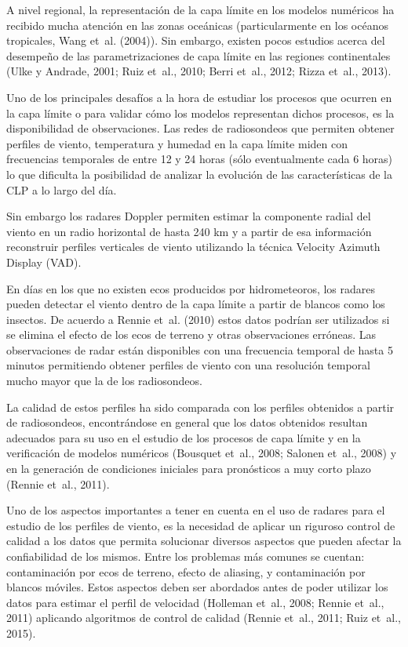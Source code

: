 \documentclass[12pt,spanish,oneside]{book}
\begin{document}
A nivel regional, la representación de la capa límite en los modelos
numéricos ha recibido mucha atención en las zonas oceánicas
(particularmente en los océanos tropicales, Wang et~al. (2004)). Sin
embargo, existen pocos estudios acerca del desempeño de las
parametrizaciones de capa límite en las regiones continentales (Ulke y
Andrade, 2001; Ruiz et~al., 2010; Berri et~al., 2012; Rizza et~al.,
2013).

Uno de los principales desafíos a la hora de estudiar los procesos que
ocurren en la capa límite o para validar cómo los modelos representan
dichos procesos, es la disponibilidad de observaciones. Las redes de
radiosondeos que permiten obtener perfiles de viento, temperatura y
humedad en la capa límite miden con frecuencias temporales de entre 12 y
24 horas (sólo eventualmente cada 6 horas) lo que dificulta la
posibilidad de analizar la evolución de las características de la CLP a
lo largo del día.

Sin embargo los radares Doppler permiten estimar la componente radial
del viento en un radio horizontal de hasta 240 km y a partir de esa
información reconstruir perfiles verticales de viento utilizando la
técnica Velocity Azimuth Display (VAD).

En días en los que no existen ecos producidos por hidrometeoros, los
radares pueden detectar el viento dentro de la capa límite a partir de
blancos como los insectos. De acuerdo a Rennie et~al. (2010) estos datos
podrían ser utilizados si se elimina el efecto de los ecos de terreno y
otras observaciones erróneas. Las observaciones de radar están
disponibles con una frecuencia temporal de hasta 5 minutos permitiendo
obtener perfiles de viento con una resolución temporal mucho mayor que
la de los radiosondeos.

La calidad de estos perfiles ha sido comparada con los perfiles
obtenidos a partir de radiosondeos, encontrándose en general que los
datos obtenidos resultan adecuados para su uso en el estudio de los
procesos de capa límite y en la verificación de modelos numéricos
(Bousquet et~al., 2008; Salonen et~al., 2008) y en la generación de
condiciones iniciales para pronósticos a muy corto plazo (Rennie et~al.,
2011).

Uno de los aspectos importantes a tener en cuenta en el uso de radares
para el estudio de los perfiles de viento, es la necesidad de aplicar un
riguroso control de calidad a los datos que permita solucionar diversos
aspectos que pueden afectar la confiabilidad de los mismos. Entre los
problemas más comunes se cuentan: contaminación por ecos de terreno,
efecto de aliasing, y contaminación por blancos móviles. Estos aspectos
deben ser abordados antes de poder utilizar los datos para estimar el
perfil de velocidad (Holleman et~al., 2008; Rennie et~al., 2011)
aplicando algoritmos de control de calidad (Rennie et~al., 2011; Ruiz
et~al., 2015).
\end{document}
